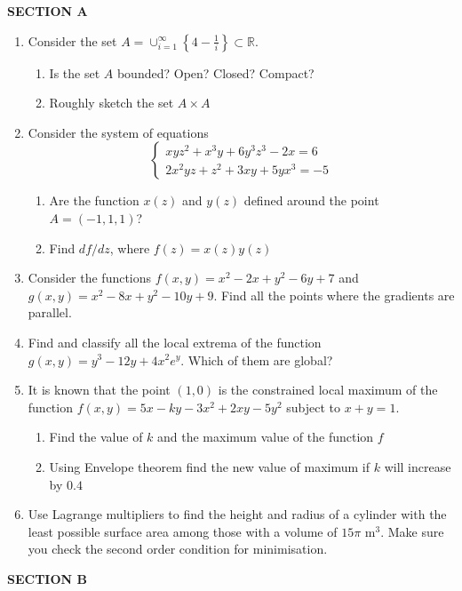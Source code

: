 \documentclass[12pt,a4paper]{article}
\begin{document}
\vspace{10pt}

\textbf{SECTION A}


\begin{enumerate}
\item Consider the set $A=\cup_{i=1}^{\infty} \left\{ 4-\frac{1}{i} \right\} \subset \mathbb{R}$.
\begin{enumerate}
\item Is the set $A$ bounded? Open? Closed? Compact?
\item Roughly sketch the set $A \times A$
\end{enumerate}

\item Consider the system of equations 
\[
\begin{cases}
xyz^2+x^3y+6y^3z^3-2x=6 \\
2x^2yz+z^2+3xy+5yx^3=-5
\end{cases}
\]
\begin{enumerate}
\item Are the function $x(z)$ and $y(z)$ defined around the point $A=(-1,1,1)$?
\item Find $df/dz$, where $f(z)=x(z)y(z)$
\end{enumerate}
\item Consider the functions $f(x,y)=x^2-2x+y^2-6y+7$ and $g(x,y)=x^2-8x+y^2-10y+9$. Find all the points where the gradients are parallel.
\item Find and classify all the local extrema of the function $g(x,y)=y^3 -12y+4x^2e^y$. Which of them are global?
\item It is known that the point $(1,0)$ is the constrained local maximum of the function $f(x,y)=5x-ky-3x^2+2xy-5y^2$ subject to $x+y=1$.
\begin{enumerate}
\item Find the value of $k$ and the maximum value of the function $f$
\item Using Envelope theorem find the new value of maximum if $k$ will increase by $0.4$
\end{enumerate}
\item Use Lagrange multipliers to find the height and radius of a cylinder with the least possible
surface area among those with a volume of $15\pi$ m$^3$. Make sure you check the second order
condition for minimisation.
\end{enumerate}

\textbf{SECTION B}
\end{document}
